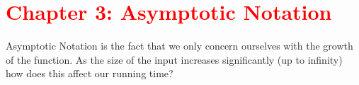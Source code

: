 \documentclass{report}
\begin{document}
	\chapter*{\textcolor{red}{Chapter 3: Asymptotic Notation}}
	Asymptotic Notation is the fact that we only concern ourselves with the growth of the function.
	As the size of the input increases significantly (up to infinity) how does this affect our running time?
	
	
\end{document}
